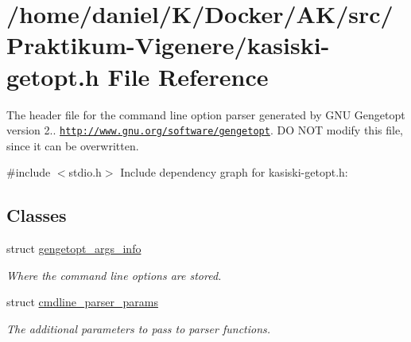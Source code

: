 \hypertarget{kasiski-getopt_8h}{}\section{/home/daniel/\+K/\+Docker/\+A\+K/src/\+Praktikum-\/\+Vigenere/kasiski-\/getopt.h File Reference}
\label{kasiski-getopt_8h}


The header file for the command line option parser generated by G\+NU Gengetopt version 2.. \href{http://www.gnu.org/software/gengetopt}{\tt http\+://www.\+gnu.\+org/software/gengetopt}. DO N\+OT modify this file, since it can be overwritten.  


{\ttfamily \#include $<$stdio.\+h$>$}\newline
Include dependency graph for kasiski-\/getopt.h\+:
\subsection*{Classes}
\begin{DoxyCompactItemize}
\item 
struct \hyperlink{structgengetopt__args__info}{gengetopt\+\_\+args\+\_\+info}
\begin{DoxyCompactList}\small\item\em Where the command line options are stored. \end{DoxyCompactList}\item 
struct \hyperlink{structcmdline__parser__params}{cmdline\+\_\+parser\+\_\+params}
\begin{DoxyCompactList}\small\item\em The additional parameters to pass to parser functions. \end{DoxyCompactList}\end{DoxyCompactItemize}
